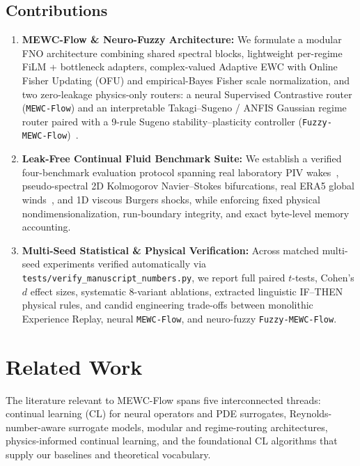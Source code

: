 \documentclass[11pt,a4paper]{article}
\begin{document}
\subsection*{Contributions}
\begin{enumerate}
  \item \textbf{MEWC-Flow \& Neuro-Fuzzy Architecture:} We formulate a modular FNO architecture combining shared spectral blocks, lightweight per-regime FiLM + bottleneck adapters, complex-valued Adaptive EWC with Online Fisher Updating (OFU) and empirical-Bayes Fisher scale normalization, and two zero-leakage physics-only routers: a neural Supervised Contrastive router (\texttt{MEWC-Flow}) and an interpretable Takagi--Sugeno / ANFIS Gaussian regime router paired with a 9-rule Sugeno stability--plasticity controller (\texttt{Fuzzy-MEWC-Flow})~\cite{mamdani1974fuzzy,takagi1985fuzzy,jang1993anfis}.
  \item \textbf{Leak-Free Continual Fluid Benchmark Suite:} We establish a verified four-benchmark evaluation protocol spanning real laboratory PIV wakes~\cite{renn2026piv}, pseudo-spectral 2D Kolmogorov Navier--Stokes bifurcations, real ERA5 global winds~\cite{rasp2024wb2}, and 1D viscous Burgers shocks, while enforcing fixed physical nondimensionalization, run-boundary integrity, and exact byte-level memory accounting.
  \item \textbf{Multi-Seed Statistical \& Physical Verification:} Across matched multi-seed experiments verified automatically via \texttt{tests/verify\_manuscript\_numbers.py}, we report full paired $t$-tests, Cohen's $d$ effect sizes, systematic 8-variant ablations, extracted linguistic IF--THEN physical rules, and candid engineering trade-offs between monolithic Experience Replay, neural \texttt{MEWC-Flow}, and neuro-fuzzy \texttt{Fuzzy-MEWC-Flow}.
\end{enumerate}

\section{Related Work}

The literature relevant to MEWC-Flow spans five interconnected threads: continual learning (CL) for neural operators and PDE surrogates, Reynolds-number-aware surrogate models, modular and regime-routing architectures, physics-informed continual learning, and the foundational CL algorithms that supply our baselines and theoretical vocabulary.
\end{document}
